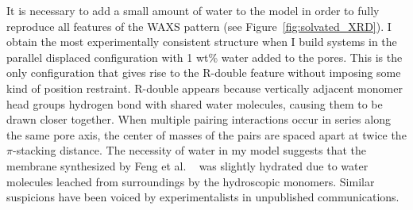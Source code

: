 \documentclass{article}
\begin{document}
  It is necessary to add a small amount of water to the model in order to 
  fully reproduce all features of the WAXS pattern (see Figure~\ref{fig:solvated_XRD}).
  I obtain the most experimentally consistent structure when I build systems
  in the parallel displaced configuration with 1 wt\% water added to the pores. 
  This is the only configuration that gives rise to the R-double feature without
  imposing some kind of position restraint. R-double appears because 
  vertically adjacent monomer head groups hydrogen bond with shared water molecules,
  causing them to be drawn closer together. When multiple pairing interactions
  occur in series along the same pore axis, the center of masses of the pairs 
  are spaced apart at twice the $\pi$-stacking distance. The necessity of water
  in my model suggests that the membrane synthesized by Feng et al.
  ~\cite{feng_scalable_2014,feng_thin_2016} was slightly hydrated due to water 
  molecules leached from surroundings by the hydroscopic monomers. Similar 
  suspicions have been voiced by experimentalists in unpublished communications.
  
\end{document}
